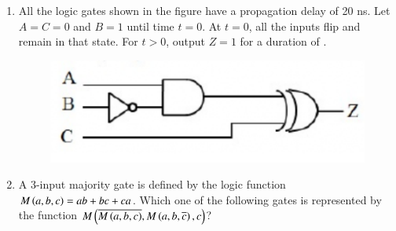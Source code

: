 \documentclass[a4paper, 11pt]{article}
\begin{document}
\begin{enumerate}
    \hfill{}

    \item All the logic gates shown in the figure have a propagation delay of 20 ns. Let $A=C=0$ and $B=1$ until time $t=0$. At $t=0$, all the inputs flip  and remain in that state. For $t>0$, output $Z=1$ for a duration  of \underline{\hspace{2cm}}.
    \begin{figure}[H]
        \centering
        \includegraphics[width=0.4\columnwidth]{figs/q47.png}
        \caption*{}
        \label{fig:q47}
    \end{figure}
    
    \hfill{}

    \item A 3-input majority gate is defined by the logic function $M\left(a,b,c\right)=ab+bc+ca$. Which one of the following gates is represented by the function $M\left(\overline{M\left(a,b,c\right)}, M\left(a,b,\overline{c}\right),c\right)$?
    \begin{enumerate}
    \end{enumerate}
    
    \hfill{}


\end{enumerate}
\end{document}
